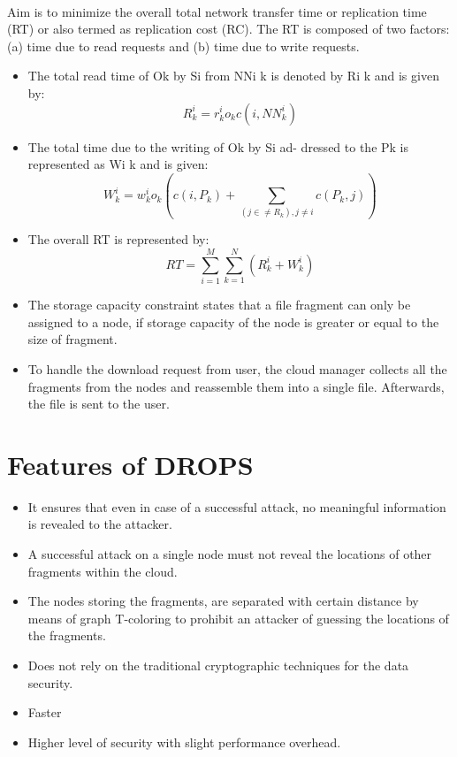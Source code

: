\paragraph*{}
Aim is to minimize the overall total network transfer time or replication time (RT)
or also termed as replication cost (RC). The RT is composed of two factors: (a) time due
to read requests and (b) time due to write requests.

\begin{itemize}
	\item The total read time of Ok by Si from NNi k is denoted by Ri k and is given by:
	$$ R_{k}^{i} = r_{k}^{i}o_{k}c(i , N N_{k}^{i})$$
	\item The total time due to the writing of Ok by Si ad- dressed to the Pk is represented as Wi
	k and is given:
	\[
	W_{k}^{i} = w_{k}^{i}o_{k}(c(i, P_{k})+ \sum_{ (j \in\neq R_{k}) , j \neq i} c(P_{k}, j))
	\]
	\item The overall RT is represented by:
	\[
	RT = \sum_{i = 1}^{M} \sum_{ k = 1}^{N} (R_{k}^{i} + W_{k}^{i})
	\]
	\item The storage capacity constraint states that a file fragment can only be assigned to a
	node, if storage capacity of the node is greater or equal to the size of fragment.
	\item To handle the download request from user, the cloud manager collects all the fragments from the nodes and reassemble them into a single file. Afterwards, the file is sent to the
	user.
\end{itemize}
\section{Features of DROPS}
\begin{itemize}
	\item It ensures that even in case of a successful attack, no meaningful information is revealed
	to the attacker.
	\item A successful attack on a single node must not reveal the locations of other fragments
	within the cloud.
	\item The nodes storing the fragments, are separated with certain distance by means of graph
	T-coloring to prohibit an attacker of guessing the locations of the fragments.
	\item Does not rely on the traditional cryptographic techniques for the data security.
	\item Faster
	\item Higher level of security with slight performance overhead.
\end{itemize}